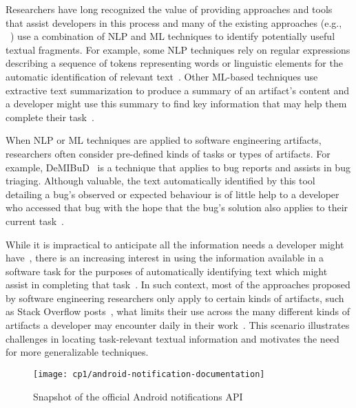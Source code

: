 

Researchers have long recognized the value of 
providing approaches and tools that assist developers in this process
and many of the existing approaches (e.g., ~\cite{nadi2020, Robillard2015, Xu2017})
use a combination of \acf{NLP} and \acf{ML} techniques to identify potentially useful textual fragments. 
For example, some \acs{NLP} techniques rely on regular expressions describing a sequence of tokens
representing words or linguistic elements for the automatic identification 
of relevant text~\cite{Bavota2016, Chaparro2017}. 
Other \acs{ML}-based techniques use extractive text summarization 
to produce a summary of an artifact's content
and a developer might use this summary to find key information
that may help them complete their task~\cite{Bavota2016}.



When \acs{NLP} or \acs{ML} techniques are applied to software engineering artifacts, researchers often 
consider pre-defined kinds of tasks or types of artifacts.
For example, {\small DeMIBuD}~\cite{Chaparro2017} is a technique that applies to bug reports and 
assists in bug triaging. Although valuable, the text  automatically identified by this tool detailing a bug's observed or expected
behaviour 
 is of little help to a developer who accessed that bug 
with the hope that the bug's solution also applies to their current task~\cite{Viviani2019}.


While it is impractical to anticipate all the information needs a developer might have~\cite{sillito2006, josyula2018, ko2007}, there is an increasing interest in using the information 
available in a software task for the purposes of automatically identifying text 
which might assist in completing that task~\cite{Bavota2016}. 
In such context, most of the approaches proposed by software engineering researchers 
 only apply to certain kinds of artifacts, such as Stack Overflow posts~\cite{Xu2017, silva2019}, what limits their use across the
many different kinds of artifacts a developer may encounter
daily in their work~\cite{Li2013}.
This scenario illustrates challenges in locating task-relevant textual information and motivates the need for more generalizable techniques.




\clearpage


\begin{landscape}
\begin{figure}
    \centering
    \texttt{[image: cp1/android-notification-documentation]}
    \caption{Snapshot of the official Android notifications API}
    \label{fig:android-notifications-api-page}
\end{figure}

\end{landscape}

